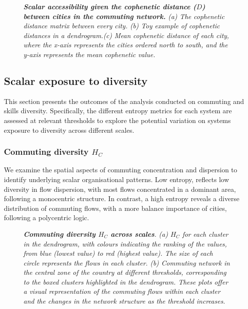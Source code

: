 \documentclass[11pt, a4paper]{article}
\begin{document}
\begin{figure}[h!]
\centering
{}
\caption{\textit{\textbf{Scalar accessibility given the cophenetic distance ($D$) between cities in the commuting network.} (a) The cophenetic distance matrix between every city. (b) Toy example of cophenetic distances in a dendrogram.(c) Mean cophenetic distance of each city, where the x-axis represents the cities ordered north to south, and the y-axis represents the mean cophenetic value.}}
\label{cophe}
\end{figure}


\subsection{Scalar exposure to diversity}

This section presents the outcomes of the analysis conducted on commuting and skills diversity. Specifically, the different entropy metrics for each system are assessed at relevant thresholds to explore the potential variation on systems exposure to diversity across different scales.

\subsubsection{Commuting diversity $H_{C}$}

We examine the spatial aspects of commuting concentration and dispersion to identify underlying scalar organisational patterns. Low entropy, reflects low diversity in flow dispersion, with most flows concentrated in a dominant area, following a monocentric structure. In contrast, a high entropy reveals a diverse distribution of commuting flows, with a more balance importance of cities, following a polycentric logic.

\begin{figure}[h!]
\centering
{}
\caption{\textit{\textbf{Commuting diversity $H_{C}$ across scales}. (a) $H_{C}$ for each cluster in the dendrogram, with colours indicating the ranking of the values, from blue (lowest value) to red (highest value). The size of each circle represents the flows in each cluster. (b) Commuting network in the central zone of the country at different thresholds, corresponding to the boxed clusters highlighted in the dendrogram. These plots offer a visual representation of the commuting flows within each cluster and the changes in the network structure as the threshold increases.}}
\label{com}
\end{figure}
\end{document}
